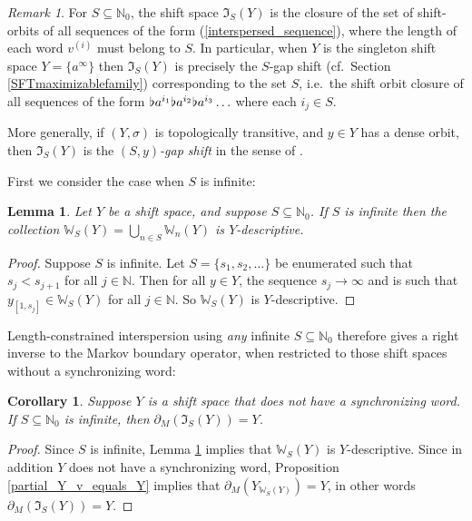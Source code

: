 \documentclass[reqno,11pt]{amsart}
\newtheorem{lem}[thm]{Lemma}
\newtheorem{cor}[thm]{Corollary}
\theoremstyle{definition}
\theoremstyle{remark}
\theoremstyle{remark}
\newtheorem{rem}[thm]{Remark}
\def \N {\mathbb N}
\def\w{\mathbb{W}}
\def\i{\mathfrak{I}}
\def\b{\kern 0.02em \flat \kern 0.02em}
\numberwithin{equation}{section}
\begin{document}
\begin{rem}
For $S\subseteq\N_0$, the shift space $\i_S(Y)$ is the closure of the set of shift-orbits of all sequences of the form
(\ref{interspersed_sequence}), where the length of each word $v^{(i)}$ must belong to $S$.
In particular, when $Y$ is the singleton shift space $Y=\{a^\infty\}$ then $\i_S(Y)$ is precisely the
$S$-gap shift (cf.~Section \ref{SFTmaximizablefamily}) corresponding to the set $S$,
i.e.~the shift orbit closure of all sequences of the form $\b a^{i_1}\b a^{i_2}\b a^{i_3}\ldots$ where each $i_j\in S$.

More generally, if $(Y,\sigma)$ is topologically transitive, and $y\in Y$ has a dense orbit, then $\i_S(Y)$
is the \emph{$(S,y)$-gap shift} in the sense of \cite{RS25}. 
\end{rem}


First we consider the case when $S$ is infinite:


\begin{lem}\label{S_infinite_Y_descriptive}
Let $Y$ be a shift space, and suppose $S\subseteq\N_0$.
If $S$ is infinite then
the collection $\w_S(Y)=\bigcup_{n\in S} \w_n(Y)$
is $Y$-descriptive.
\end{lem}
\begin{proof}
Suppose $S$ is infinite. Let $S=\{s_1,s_2,\ldots\}$ be enumerated such that $s_j < s_{j+1}$ for all $j\in\N$.
Then for all $y\in Y$, the sequence $s_j\to\infty$
and is such that $y_{[1,s_j]}\in\w_S(Y)$ for all $j\in\N$.
So $\w_S(Y)$ is $Y$-descriptive.
\end{proof}



Length-constrained interspersion using \emph{any} infinite $S\subseteq\N_0$
therefore gives a right inverse to the Markov boundary operator,
when restricted to those
shift spaces without  a synchronizing word:

\begin{cor}\label{partial_Y_v_equals_Y_cor}
Suppose $Y$ is a shift space that  does not have a synchronizing word.
 If $S\subseteq\N_0$ is infinite,
then $\partial_M( \i_S(Y) ) = Y$.
\end{cor}
\begin{proof}
Since $S$ is infinite,
Lemma \ref{S_infinite_Y_descriptive} implies that $\w_S(Y)$ is $Y$-descriptive.
Since in addition $Y$ does not have a synchronizing word,
Proposition \ref{partial_Y_v_equals_Y} implies that $\partial_M( Y_{\w_S(Y)})=Y$,
in other words
 $\partial_M( \i_S(Y) ) = Y$.
\end{proof}
\end{document}

